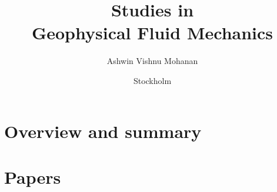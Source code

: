 \documentclass{./templates/mechthesis/MechThesis}
\title[Studies in Geophysical Fluid Mechanics]%
{%
	Studies in \\ Geophysical Fluid Mechanics
}%
\author{Ashwin Vishnu Mohanan}%
\affiliation
{%
	Linn\'e FLOW Centre, KTH Royal Institute of Technology, Department of Mechanics\\
	SE--100 44 Stockholm, Sweden%
}%
\date{Stockholm}{{June}}{{2019}}%
\begin{document}
%
\frontmatter




%
\mainmatter

\part{Overview and summary}

%
\begin{refsection}
  
\end{refsection}

%
\tocpagebreak


%
\part{Papers}

%
\makepapersummary
\cleardoublepage

%
\begin{refsection}
 
\end{refsection}

\begin{refsection}
 
\end{refsection}

\begin{refsection}
 
\end{refsection}

\begin{refsection}
 
\end{refsection}

\begin{refsection}
 
\end{refsection}

\end{document}
